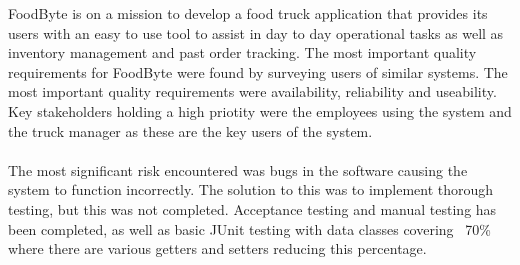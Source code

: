 FoodByte is on a mission to develop a food truck application that provides its users with an easy to use tool to assist in day to day operational tasks as well as inventory management and past order tracking. The most important quality requirements for FoodByte were found by surveying users of similar systems. The most important quality requirements were availability, reliability and useability. Key stakeholders holding a high priotity were the employees using the system and the truck manager as these are the key users of the system.
\\ \\
\noindent The most significant risk encountered was bugs in the software causing the system to function incorrectly. The solution to this was to implement thorough testing, but this was not completed. Acceptance testing and manual testing has been completed, as well as basic JUnit testing with data classes covering ~70\% where there are various getters and setters reducing this percentage.